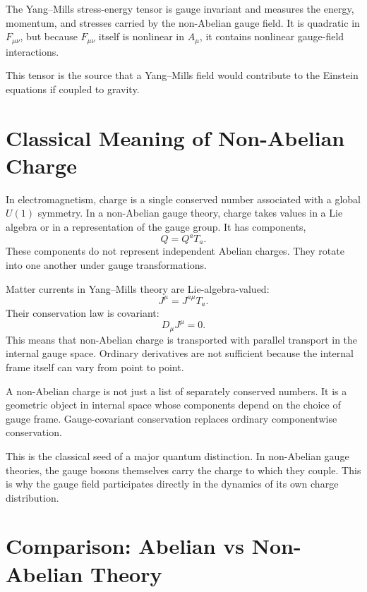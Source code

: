 \begin{definitionbox}
The Yang--Mills stress-energy tensor is gauge invariant and measures the energy,
momentum, and stresses carried by the non-Abelian gauge field. It is quadratic in
\(F_{\mu\nu}\), but because \(F_{\mu\nu}\) itself is nonlinear in \(A_\mu\), it
contains nonlinear gauge-field interactions.
\end{definitionbox}

This tensor is the source that a Yang--Mills field would contribute to the
Einstein equations if coupled to gravity.

\section{Classical Meaning of Non-Abelian Charge}

In electromagnetism, charge is a single conserved number associated with a
global \(U(1)\) symmetry. In a non-Abelian gauge theory, charge takes values in a
Lie algebra or in a representation of the gauge group. It has components,
\[
    Q=Q^aT_a.
\]
These components do not represent independent Abelian charges. They rotate into
one another under gauge transformations.

Matter currents in Yang--Mills theory are Lie-algebra-valued:
\[
    J^\mu=J^{a\mu}T_a.
\]
Their conservation law is covariant:
\[
    D_\mu J^\mu=0.
\]
This means that non-Abelian charge is transported with parallel transport in the
internal gauge space. Ordinary derivatives are not sufficient because the
internal frame itself can vary from point to point.

\begin{remarkbox}
A non-Abelian charge is not just a list of separately conserved numbers. It is a
geometric object in internal space whose components depend on the choice of gauge
frame. Gauge-covariant conservation replaces ordinary componentwise conservation.
\end{remarkbox}

This is the classical seed of a major quantum distinction. In non-Abelian gauge
theories, the gauge bosons themselves carry the charge to which they couple.
This is why the gauge field participates directly in the dynamics of its own
charge distribution.

\section{Comparison: Abelian vs Non-Abelian Theory}

